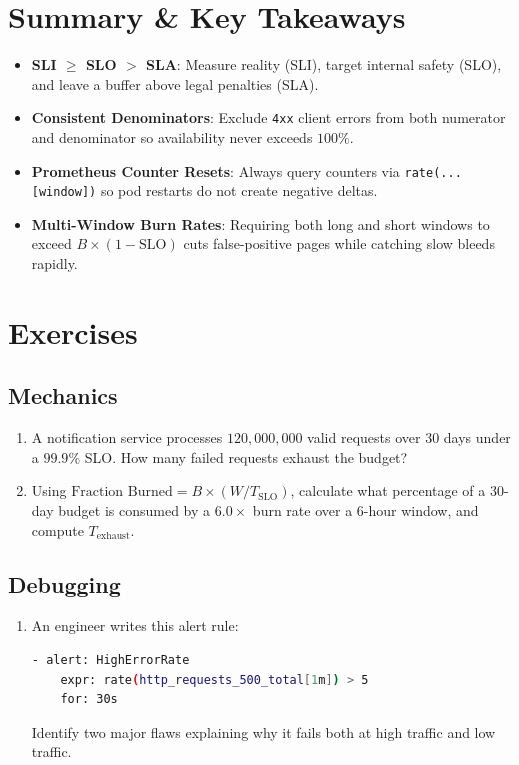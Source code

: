 \section{Summary \protect\& Key Takeaways}

\begin{itemize}[leftmargin=18pt]
  \item \textbf{SLI $\ge$ SLO $>$ SLA}: Measure reality (SLI), target internal safety (SLO), and leave a buffer above legal penalties (SLA).
  \item \textbf{Consistent Denominators}: Exclude \texttt{4xx} client errors from both numerator and denominator so availability never exceeds $100\%$.
  \item \textbf{Prometheus Counter Resets}: Always query counters via \texttt{rate(...[window])} so pod restarts do not create negative deltas.
  \item \textbf{Multi-Window Burn Rates}: Requiring both long and short windows to exceed $B \times (1 - \text{SLO})$ cuts false-positive pages while catching slow bleeds rapidly.
\end{itemize}

\section{Exercises}

\subsection*{Mechanics}
\begin{enumerate}[label=\textbf{Exercise~\thechapter.\arabic*}, leftmargin=*]
  \item A notification service processes $120,000,000$ valid requests over 30 days under a $99.9\%$ SLO. How many failed requests exhaust the budget?
  \item Using $\text{Fraction Burned} = B \times (W / T_{\text{SLO}})$, calculate what percentage of a 30-day budget is consumed by a $6.0\times$ burn rate over a 6-hour window, and compute $T_{\text{exhaust}}$.
\end{enumerate}

\subsection*{Debugging}
\begin{enumerate}[label=\textbf{Exercise~\thechapter.\arabic*}, leftmargin=*, start=3]
  \item An engineer writes this alert rule:
  \begin{lstlisting}[language=bash]
  - alert: HighErrorRate
    expr: rate(http_requests_500_total[1m]) > 5
    for: 30s
  \end{lstlisting}
  Identify two major flaws explaining why it fails both at high traffic and low traffic.
\end{enumerate}

